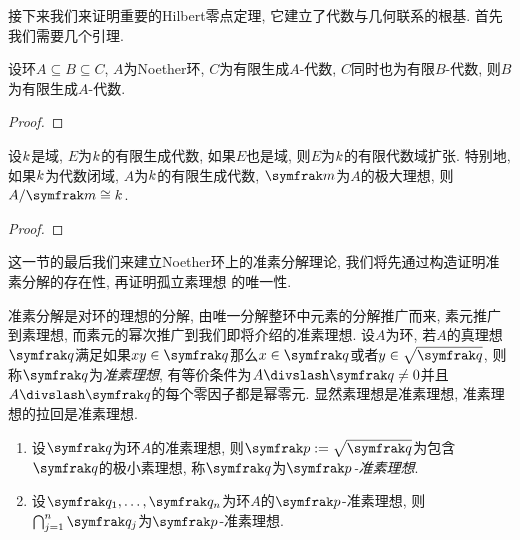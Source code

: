 接下来我们来证明重要的Hilbert零点定理, 它建立了代数与几何联系的根基. 首先我们需要几个引理.

\begin{proposition}
    设环$A\subseteq B\subseteq C$, $A$为Noether环, $C$为有限生成$A$-代数, $C$同时也为有限$B$-代数, 则$B$为有限生成$A$-代数.
\end{proposition}

\begin{proof}

\end{proof}

\begin{theorem}
    设$k$是域, $E$为$k$的有限生成代数, 如果$E$也是域, 则$E$为$k$的有限代数域扩张. 特别地, 如果$k$为代数闭域, $A$为$k$的有限生成代数, $\ideal{m}$为$A$的极大理想, 则$A/\ideal{m}\cong \field{k}$.
\end{theorem}

\begin{proof}
\end{proof}

这一节的最后我们来建立Noether环上的准素分解理论, 我们将先通过构造证明准素分解的存在性, 再证明孤立素理想%
的唯一性.

准素分解是对环的理想的分解, 由唯一分解整环中元素的分解推广而来, 素元推广到素理想, 而素元的幂次推广到我们即将介绍的准素理想. 设$A$为环, 若$A$的真理想$\ideal{q}$满足如果$xy\in \ideal{q}$那么$x\in\ideal{q}$或者$y\in\sqrt{\ideal{q}}$, 则称$\ideal{q}$为\emph{准素理想}, 有等价条件为$A{\divslash}\ideal{q}\neq 0$并且$A{\divslash}\ideal{q}$的每个零因子都是幂零元. 显然素理想是准素理想, 准素理想的拉回是准素理想.

\begin{proposition}\label{prop:primary}\leavevmode
    \begin{enumerate}
        \item 设$\ideal{q}$为环$A$的准素理想, 则$\ideal{p}:=\sqrt{\ideal{q}}$为包含$\ideal{q}$的极小素理想, 称$\ideal{q}$为\emph{$\ideal{p}$-准素理想}.
        \item\label{enum:prim-inte} 设$\ideal{q}_1, \dotsc, \ideal{q}_n$为环$A$的$\ideal{p}$-准素理想, 则$\bigcap_{j=1}^n\ideal{q}_j$为$\ideal{p}$-准素理想.
    \end{enumerate}
\end{proposition}

